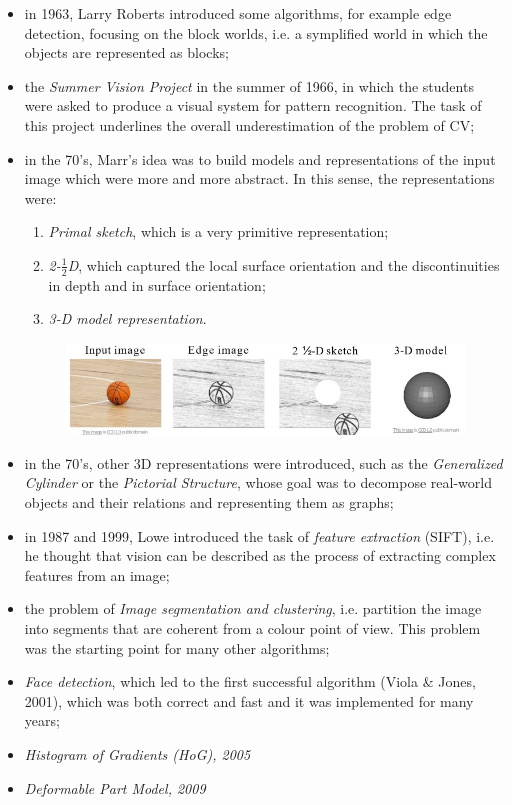 \begin{itemize}
    \item in 1963, Larry Roberts introduced some algorithms, for example edge detection, focusing on the block worlds, i.e. a symplified world in which the objects are represented as blocks;
    \item the \textit{Summer Vision Project} in the summer of 1966, in which the students were asked to produce a visual system for pattern recognition. The task of this project underlines the overall underestimation of the problem of CV;
    \item in the 70's, Marr's idea was to build models and representations of the input image which were more and more abstract. In this sense, the representations were:
    \begin{enumerate}
        \item \textit{Primal sketch}, which is a very primitive representation;
        \item \textit{2-$\frac{1}{2}$D}, which captured the local surface orientation and the discontinuities in depth and in surface orientation;
        \item \textit{3-D model representation}.
    \end{enumerate}
    \begin{figure}[h!]
		\centering
		\includegraphics[scale = 1.5]{img/marr.jpg}
    \end{figure}
    \item in the 70's, other 3D representations were introduced, such as the \textit{Generalized Cylinder} or the \textit{Pictorial Structure}, whose goal was to decompose real-world objects and their relations and representing them as graphs;
    \item in 1987 and 1999, Lowe introduced the task of \textit{feature extraction} (SIFT), i.e. he thought that vision can be described as the process of extracting complex features from an image;
    \item the problem of \textit{Image segmentation and clustering}, i.e. partition the image into segments that are coherent from a colour point of view. This problem was the starting point for many other algorithms;
    \item \textit{Face detection}, which led to the first successful algorithm (Viola & Jones, 2001), which was both correct and fast and it was implemented for many years;
    \item \textit{Histogram of Gradients (HoG), 2005}
    \item \textit{Deformable Part Model, 2009}
\end{itemize}

